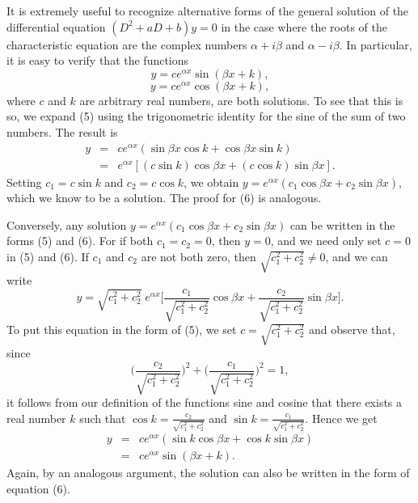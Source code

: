 It is extremely useful to recognize alternative forms of the general solution of the differential equation $(D^2 + aD + b)y = 0$ in the case where the roots of the characteristic equation are the complex numbers $\alpha + i\beta$ and $\alpha - i \beta$. In particular, it is easy to verify that the functions
\begin{equation}
y = c e^{\alpha x} \sin(\beta x + k),  
\label{eq11.1.5}
\end{equation}
\begin{equation}
y = c e^{\alpha x} \cos(\beta x + k),  
\label{eq11.1.6}
\end{equation}
where $c$ and $k$ are arbitrary real numbers, are both solutions. To see that this is so, we expand (5) using the trigonometric identity for the sine of the sum of two numbers. The result is
\begin{eqnarray*}
y &=& ce^{\alpha x} (\sin \beta x \cos k + \cos \beta x \sin k)\\
   &=& e^{\alpha x}[(c \sin k) \cos \beta x + (c \cos k) \sin \beta x].
\end{eqnarray*}
Setting $c_1 = c \sin k$ and $c_2 = c \cos k$, we obtain $y = e^{\alpha x}(c_1\cos \beta x + c_2\sin \beta x)$, which we know to be a solution. The proof for (6) is analogous.

Conversely, any solution $y = e^{\alpha x}(c_1 \cos \beta x + c_2 \sin \beta x)$ can be written in the forms (5) and (6). For if both $c_1 = c_2 = 0$, then $y = 0$, and we need only set $c = 0$ in (5) and (6). If $c_1$ and $c_2$ are not both zero, then $\sqrt{c_1^2 + c_2^2} \neq 0$, and we can write
$$
y = \sqrt{c_1^2 + c_2^2}\; e^{\alpha x} \Big[\frac{c_1}{\sqrt{c_1^2 + c_2^2}} \cos \beta x +  \frac{c_2}{\sqrt{c_1^2 + c_2^2}} \sin \beta x \Big] .
$$
To put this equation in the form of (5), we set $c = \sqrt{c_1^2 + c_2^2}$ and observe that, since
$$
\Big(\frac{c_2}{\sqrt{c_1^2 + c_2^2}} \Big)^2 + \Big(\frac{c_1}{\sqrt{c_1^2 + c_2^2}} \Big)^2 = 1,
$$
it follows from our definition of the functions sine and cosine that there exists a real number $k$ such that $\cos k = \frac{c_2}{\sqrt{c_1^2 + c_2^2}}$ and $\sin k = \frac{c_1}{\sqrt{c_1^2 + c_2^2}}$.  Hence we get 
\begin{eqnarray*}
y &=& ce^{\alpha x}(\sin k \cos \beta x + \cos k \sin \beta x) \\
   &=& ce^{\alpha x} \sin(\beta x + k).
\end{eqnarray*}
Again, by an analogous argument, the solution can also be written in the form of equation (6).

